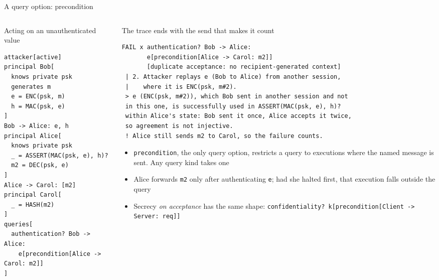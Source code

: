 \ifdefined\PRESENTATION\else\PassOptionsToClass{handout}{beamer}\fi\documentclass[aspectratio=169, lualatex]{beamer}
\newcommand{\vpcode}{\fontsize{6}{6.4}\selectfont\ttfamily\color{vpink}}
\begin{document}
\begin{frame}[fragile]{A query option: precondition}
	\begin{columns}[t]
		\begin{column}{0.40\textwidth}
			\begin{vpmodel}[top=0.5mm, bottom=0.5mm]{Acting on an unauthenticated value}
				\begin{lstlisting}[basicstyle=\vpcode]
attacker[active]
principal Bob[
  knows private psk
  generates m
  e = ENC(psk, m)
  h = MAC(psk, e)
]
Bob -> Alice: e, h
principal Alice[
  knows private psk
  _ = ASSERT(MAC(psk, e), h)?
  m2 = DEC(psk, e)
]
Alice -> Carol: [m2]
principal Carol[
  _ = HASH(m2)
]
queries[
  authentication? Bob -> Alice:
    e[precondition[Alice -> Carol: m2]]
]
\end{lstlisting}
			\end{vpmodel}
		\end{column}
		\begin{column}{0.58\textwidth}
			\begin{vpresult}[top=0.5mm, bottom=0.5mm]{The trace ends with the send that makes it count}
				\begin{lstlisting}[basicstyle=\vpcode]
FAIL x authentication? Bob -> Alice:
       e[precondition[Alice -> Carol: m2]]
       [duplicate acceptance: no recipient-generated context]
 | 2. Attacker replays e (Bob to Alice) from another session,
 |    where it is ENC(psk, m#2).
 > e (ENC(psk, m#2)), which Bob sent in another session and not
 in this one, is successfully used in ASSERT(MAC(psk, e), h)?
 within Alice's state: Bob sent it once, Alice accepts it twice,
 so agreement is not injective.
 ! Alice still sends m2 to Carol, so the failure counts.
\end{lstlisting}
			\end{vpresult}
			\scriptsize
			\vspace{-0.5em}
			\begin{itemize}
				\item \texttt{precondition}, the only query option, restricts a query to executions where the named message is sent. Any query kind takes one
				\item Alice forwards \texttt{m2} only after authenticating \texttt{e}; had she halted first, that execution falls outside the query
				\item Secrecy \emph{on acceptance} has the same shape: \texttt{confidentiality? k[precondition[Client -> Server: req]]}
			\end{itemize}
		\end{column}
	\end{columns}
\end{frame}
\end{document}
